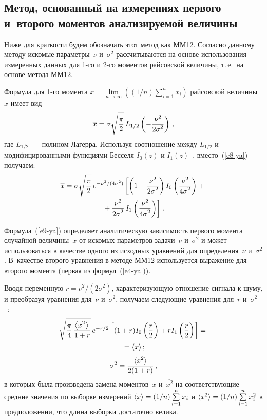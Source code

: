 \begin{multicols}{2}
\subsection{Метод, основанный на измерениях первого и~второго моментов анализируемой
величины}

     Ниже для краткости будем обозначать этот метод как ММ12. Согласно данному
методу искомые параметры~$\nu$ и~$\sigma^2$ рассчитываются на основе использования
измеренных данных для 1-го и 2-го моментов райсовской величины, т.\,е.\ на основе
метода ММ12.

     Формула для 1-го момента $\overline{x}=\lim\limits_{n\to\infty}
\left((1/n)\sum\limits_{i=1}^n x_i\right)$ райсовской величины~$x$ имеет вид~\cite{19-ya}
     \begin{equation}
     \overline{x} =\sigma \sqrt{\displaystyle\frac{\displaystyle \pi\mathstrut}{\displaystyle 2\mathstrut}}\, L_{1/2} \left( - \displaystyle\frac{\displaystyle \nu^2\mathstrut}{\displaystyle 2\sigma^2\mathstrut}\right)\,,
     \label{e8-ya}
     \end{equation}
где $L_{1/2}$~--- полином Лагерра. Используя соотношение между $L_{1/2}$ и
модифицированными функциями Бесселя $I_0(z)$ и $I_1(z)$~\cite{20-ya},
вместо~(\ref{e8-ya}) получаем:
\begin{multline}
\overline{x} =\sigma \sqrt{\displaystyle\frac{\displaystyle \pi\mathstrut}{\displaystyle 2\mathstrut}}\, e^{-\nu^2/(4\sigma^2)} \left[ \left(
1+\displaystyle\frac{\displaystyle \nu^2\mathstrut}{\displaystyle 2\sigma^2 \mathstrut} \right) I_0 \left( \displaystyle\frac{\displaystyle \nu^2\mathstrut}{\displaystyle 4\sigma^2\mathstrut} \right)
+{}\right.\\
\left.{}+\displaystyle\frac{\displaystyle \nu^2\mathstrut}{\displaystyle 2\sigma^2\mathstrut}\, I_1 \left( \displaystyle\frac{\displaystyle \nu^2\mathstrut}{\displaystyle 4\sigma^2\mathstrut}\right) \right]\,.
\label{e9-ya}
\end{multline}

    Формула~(\ref{e9-ya}) определяет аналитическую зависимость первого момента
случайной величины~$x$ от искомых параметров задачи~$\nu$ и~$\sigma^2$ и может
использоваться в качестве одного из исходных уравнений для определения~$\nu$
и~$\sigma^2$. В~качестве второго уравнения в методе ММ12 используется выражение для
второго момента (первая из формул~(\ref{e4-ya})).

    Вводя переменную $r=\nu^2/(2\sigma^2)$, характеризующую отношение сигнала к
шуму, и преобразуя уравнения для~$\nu$ и~$\sigma^2$, получаем следующие уравнения
для~$r$ и~$\sigma^2$~\cite{18-ya}:
    \begin{multline}
    \sqrt{\displaystyle\frac{\displaystyle \pi\mathstrut}{\displaystyle 4\mathstrut}\,\displaystyle\frac{\displaystyle \left\langle x^2\right\rangle\mathstrut}{\displaystyle 1+r\mathstrut}}\, e^{-r/2} \left[ (1+r) I_0 \left( \displaystyle\frac{\displaystyle r\mathstrut}{\displaystyle 2\mathstrut}\right)
+rI_1\left( \displaystyle\frac{\displaystyle r\mathstrut}{\displaystyle 2\mathstrut}\right) \right] ={}\\
{}=\langle x\rangle\,;\label{e10-ya}
\end{multline}
$$
\sigma^2 = \fr{\langle x^2\rangle}{2(1+r)}\,, %
$$
в которых была произведена замена моментов~$\overline{x}$ и~$\overline{x^2}$ на
соответствующие средние значения по выборке измерений $\langle x\rangle \hm= (1/n)
\sum\limits_{i=1}^n x_i$ и $\langle x^2\rangle \hm= (1/n) \sum\limits_{i=1}^n x_i^2$ в
предположении, что длина выборки достаточно велика.


\end{multicols}
